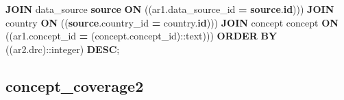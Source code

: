 \documentclass[
]{book}
\newenvironment{Shaded}{\begin{snugshade}}{\end{snugshade}}
\newcommand{\CharTok}[1]{\textcolor[rgb]{0.31,0.60,0.02}{#1}}
\newcommand{\KeywordTok}[1]{\textcolor[rgb]{0.13,0.29,0.53}{\textbf{#1}}}
\newcommand{\NormalTok}[1]{#1}
\newcommand{\OperatorTok}[1]{\textcolor[rgb]{0.81,0.36,0.00}{\textbf{#1}}}
\begin{document}
\begin{Shaded}
\begin{Highlighting}[]
    \KeywordTok{JOIN}\NormalTok{ data\_source }\KeywordTok{source} \KeywordTok{ON}\NormalTok{ ((ar1.data\_source\_id }\OperatorTok{=} \KeywordTok{source}\NormalTok{.}\KeywordTok{id}\NormalTok{)))}
    \KeywordTok{JOIN}\NormalTok{ country }\KeywordTok{ON}\NormalTok{ ((}\KeywordTok{source}\NormalTok{.country\_id }\OperatorTok{=}\NormalTok{ country.}\KeywordTok{id}\NormalTok{)))}
    \KeywordTok{JOIN}\NormalTok{ concept concept }\KeywordTok{ON}\NormalTok{ ((ar1.concept\_id }\OperatorTok{=}\NormalTok{ (concept.concept\_id):}\CharTok{:text}\NormalTok{)))}
 \KeywordTok{ORDER} \KeywordTok{BY}\NormalTok{ ((ar2.drc):}\CharTok{:integer}\NormalTok{) }\KeywordTok{DESC}\NormalTok{;}
\end{Highlighting}
\end{Shaded}

\hypertarget{concept_coverage2}{%
\subsection*{concept\_coverage2}\label{concept_coverage2}}
\end{document}
